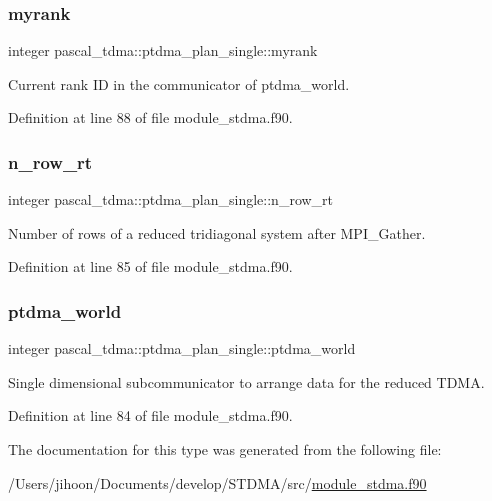 \subsubsection{\texorpdfstring{myrank}{myrank}}
{\footnotesize\ttfamily integer pascal\+\_\+tdma\+::ptdma\+\_\+plan\+\_\+single\+::myrank}



Current rank ID in the communicator of ptdma\+\_\+world. 



Definition at line 88 of file module\+\_\+stdma.\+f90.

\mbox{\label{structpascal__tdma_1_1ptdma__plan__single_a91fd8fb919f9b7d3137b13fcaa55dc1b}} 
\subsubsection{\texorpdfstring{n\_row\_rt}{n\_row\_rt}}
{\footnotesize\ttfamily integer pascal\+\_\+tdma\+::ptdma\+\_\+plan\+\_\+single\+::n\+\_\+row\+\_\+rt}



Number of rows of a reduced tridiagonal system after M\+P\+I\+\_\+\+Gather. 



Definition at line 85 of file module\+\_\+stdma.\+f90.

\mbox{\label{structpascal__tdma_1_1ptdma__plan__single_a073cddefd8ef983b185b6727d8ad7de6}} 
\subsubsection{\texorpdfstring{ptdma\_world}{ptdma\_world}}
{\footnotesize\ttfamily integer pascal\+\_\+tdma\+::ptdma\+\_\+plan\+\_\+single\+::ptdma\+\_\+world}



Single dimensional subcommunicator to arrange data for the reduced T\+D\+MA. 



Definition at line 84 of file module\+\_\+stdma.\+f90.



The documentation for this type was generated from the following file\+:\begin{DoxyCompactItemize}
\item 
/\+Users/jihoon/\+Documents/develop/\+S\+T\+D\+M\+A/src/\mbox{\hyperlink{module__stdma_8f90}{module\+\_\+stdma.\+f90}}\end{DoxyCompactItemize}
